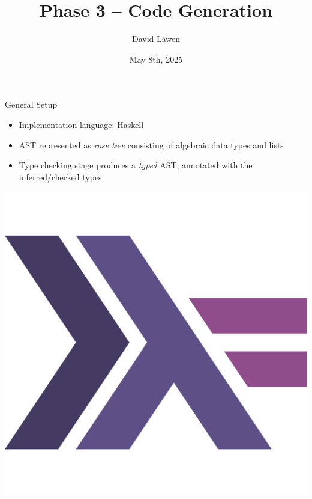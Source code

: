 \documentclass[dvipsnames,aspectratio=169]{beamer}
\title[Phase 3 -- Code Generation]%
{Phase 3 -- Code Generation}
\subtitle
{}
\author%
{David Läwen}
\institute[]%
{Compiler Construction}
\date[May 8th, 2025] %
{May 8th, 2025}
\begin{document}
\begin{frame}
  \titlepage
\end{frame}

\begin{frame}{General Setup}

  \begin{minipage}{.6\textwidth}

    \begin{itemize}
      \item Implementation language: Haskell
      \item AST represented as \emph{rose tree} consisting of algebraic data
            types and lists
      \item Type checking stage produces a \emph{typed} AST, annotated with the
            inferred/checked types
    \end{itemize}

  \end{minipage}\hfill
  \begin{minipage}{.3\textwidth}
    \includegraphics[scale=.17]{assets/haskell-icon.pdf}
  \end{minipage}

\end{frame}


\end{document}
